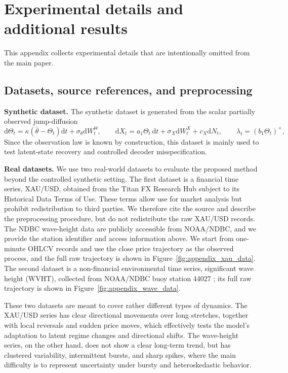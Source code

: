 \documentclass{article}
\newcommand{\dd}{\mathrm{d}}
\begin{document}
\section{Experimental details and additional results}
\label{app:exp-details}
This appendix collects experimental details that are intentionally omitted from the main paper.

\subsection{Datasets, source references, and preprocessing}
\label{app:exp_data}
\textbf{Synthetic dataset.}
The synthetic dataset is generated from the scalar partially observed jump-diffusion
\[
\dd \Theta_t=\kappa(\bar{\theta}-\Theta_t)\dd t+\sigma_\theta \dd W_t^\Theta,
\qquad
\dd X_t=a_1\Theta_t\,\dd t+\sigma_X \dd W_t^X+c_X\dd N_t,
\qquad
\lambda_t=(b_1\Theta_t)^+,
\]
Since the observation law is known by construction, this dataset is mainly used to test latent-state recovery and controlled decoder misspecification.

\textbf{Real datasets.}
We use two real-world datasets to evaluate the proposed method beyond the controlled synthetic setting. The first dataset is a financial time series, XAU/USD, obtained from the Titan FX Research Hub \cite{titanfx_xauusd_2025}  subject to its Historical Data Terms of Use. These terms allow use for market analysis but prohibit redistribution to third parties. We therefore cite the source and describe the preprocessing procedure, but do not redistribute the raw XAU/USD records. The NDBC wave-height data are publicly accessible from NOAA/NDBC, and we provide the station identifier and access information above. We start from one-minute OHLCV records and use the close price trajectory as the observed process, and the full raw trajectory is shown in Figure~\ref{fig:appendix_xau_data}. The second dataset is a non-financial environmental time series, significant wave height (WVHT), collected from NOAA/NDBC buoy station 44027 \cite{ndbc_44027_wvht_2023_2025}; its full raw trajectory is shown in Figure~\ref{fig:appendix_wave_data}.

These two datasets are meant to cover rather different types of dynamics. The XAU/USD series has clear directional movements over long stretches, together with local reversals and sudden price moves, which effectively tests the model's adaptation to latent regime changes and directional shifts. The wave-height series, on the other hand, does not show a clear long-term trend, but has clustered variability, intermittent bursts, and sharp spikes, where the main difficulty is to represent uncertainty under bursty and heteroskedastic behavior.
\end{document}
